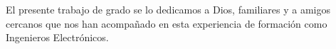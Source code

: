El presente trabajo de grado se lo dedicamos a Dios, familiares y a amigos cercanos que nos han acompañado en esta experiencia de formación como Ingenieros Electrónicos.